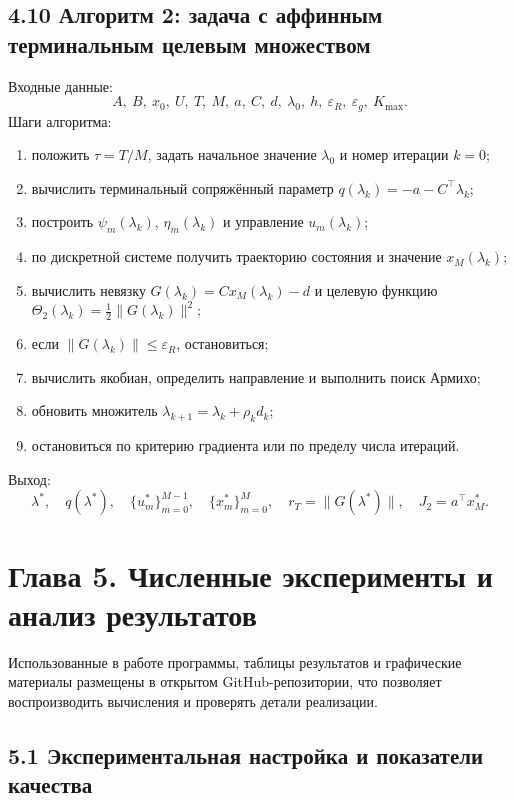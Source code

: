 \documentclass[a4paper,12pt]{article}
\begin{document}
\subsection{4.10 Алгоритм 2: задача с аффинным терминальным целевым множеством}

Входные данные:
\[
A,\ B,\ x_0,\ U,\ T,\ M,\ a,\ C,\ d,\ \lambda_0,\ h,\ \varepsilon_R,\ \varepsilon_g,\ K_{\max}.
\]
Шаги алгоритма:
\begin{enumerate}
\item положить $\tau=T/M$, задать начальное значение $\lambda_0$ и номер итерации $k=0$;
\item вычислить терминальный сопряжённый параметр $q(\lambda_k)=-a-C^\top\lambda_k$;
\item построить $\psi_m(\lambda_k)$, $\eta_m(\lambda_k)$ и управление $u_m(\lambda_k)$;
\item по дискретной системе получить траекторию состояния и значение $x_M(\lambda_k)$;
\item вычислить невязку $G(\lambda_k)=Cx_M(\lambda_k)-d$ и целевую функцию $\Theta_2(\lambda_k)=\frac12\|G(\lambda_k)\|^2$;
\item если $\|G(\lambda_k)\|\le\varepsilon_R$, остановиться;
\item вычислить якобиан, определить направление и выполнить поиск Армихо;
\item обновить множитель $\lambda_{k+1}=\lambda_k+\rho_k d_k$;
\item остановиться по критерию градиента или по пределу числа итераций.
\end{enumerate}
Выход:
\[
\lambda^*,\quad q(\lambda^*),\quad \{u_m^*\}_{m=0}^{M-1},\quad
\{x_m^*\}_{m=0}^{M},\quad r_T=\|G(\lambda^*)\|,\quad J_2=a^\top x_M^*.
\]

\section{Глава 5. Численные эксперименты и анализ результатов}

Использованные в работе программы, таблицы результатов и графические материалы размещены в открытом GitHub-репозитории\cite{github-code}, что позволяет воспроизводить вычисления и проверять детали реализации.

\subsection{5.1 Экспериментальная настройка и показатели качества}
\end{document}

